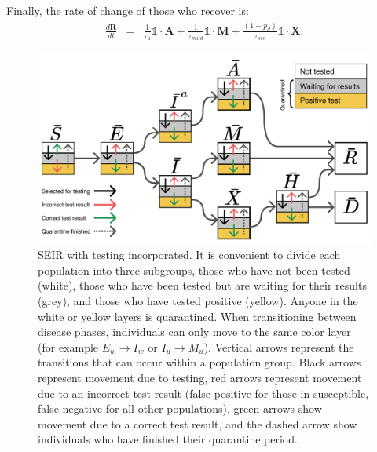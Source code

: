 \documentclass[notitlepage, superscriptaddress]{revtex4-2}
\begin{document}
Finally, the rate of change of those who recover is:
\begin{eqnarray}
\frac{d \boldsymbol{R}}{dt} &=& \frac{1}{\tau_{a}} \mathbb{1} \cdot \boldsymbol{A} + \frac{1}{\tau_{mild}} \mathbb{1} \cdot \boldsymbol{M} + \frac{(1-p_{d})}{\tau_{sev}} \mathbb{1} \cdot \boldsymbol{X}. 
\end{eqnarray}

 

\begin{figure}
\centering
\includegraphics[width=5in]{SEIR_testing_no_contact}
\caption{\label{f:SEIR-testing}
SEIR with testing incorporated. It is convenient to divide each population into three subgroups, those who have not been tested (white), those who have been tested but are waiting for their results (grey), and those who have tested positive (yellow). Anyone in the white or yellow layers is quarantined. When transitioning between disease phases, individuals can only move to the same color layer (for example $E_{w} \rightarrow I_{w}$ or $I_{u} \rightarrow M_{u}$). Vertical arrows represent the transitions that can occur within a population group. Black arrows represent movement due to testing, red arrows represent movement due to an incorrect test result (false positive for those in susceptible, false negative for all other populations), green arrows show movement due to a correct test result, and the dashed arrow show individuals who have finished their quarantine period.}
\end{figure}
\end{document}
